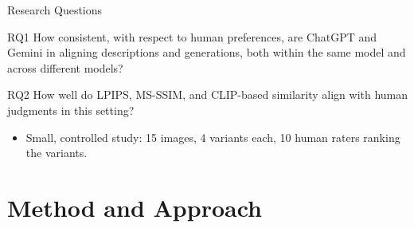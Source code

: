 \documentclass[aspectratio=169]{beamer}
\begin{document}
\begin{frame}{Research Questions}
  \begin{block}{RQ1}
    How consistent, with respect to human preferences, are ChatGPT and Gemini
    in aligning descriptions and generations, both within the same
    model and across different models?
  \end{block}
  \vspace{2mm}
  \begin{block}{RQ2}
    How well do LPIPS, MS-SSIM, and CLIP-based similarity align with human judgments in this setting?
  \end{block}
  \vspace{2mm}
  \begin{itemize}
    \item Small, controlled study: 15 images, 4 variants each,
          10 human raters ranking the variants.
  \end{itemize}
\end{frame}

\section{Method and Approach}
\end{document}
